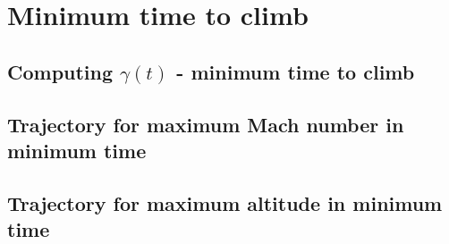 \section{Minimum time to climb}

\subsection{Computing $\gamma(t)$  - minimum time to climb}

\subsection{Trajectory for maximum Mach number in minimum time}

\subsection{Trajectory for maximum altitude in minimum time}
